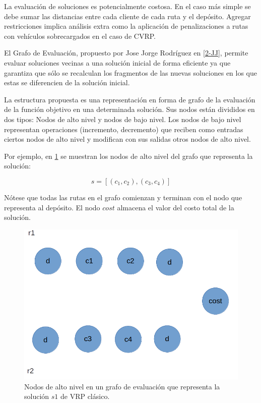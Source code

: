 La evaluación de soluciones es potencialmente costosa. En el caso más simple se debe sumar las distancias entre cada cliente de cada ruta y el depósito. Agregar restricciones implica análisis extra como la aplicación de penalizaciones a rutas con vehículos sobrecargados en el caso de CVRP.

El Grafo de Evaluación, propuesto por Jose Jorge Rodríguez en \ref{2-JJ}, permite evaluar soluciones vecinas a una solución inicial de forma eficiente ya que garantiza que sólo se recalculan los fragmentos de las nuevas soluciones en los que estas se diferencien de la solución inicial.

La estructura propuesta es una representación en forma de grafo de la evaluación de la función objetivo en una determinada solución. Sus nodos están divididos en dos tipos: Nodos de alto nivel y nodos de bajo nivel. Los nodos de bajo nivel representan operaciones (incremento, decremento) que reciben como entradas ciertos nodos de alto nivel y modifican con sus salidas otros nodos de alto nivel.

Por ejemplo, en \ref{fig:eval-graph-1} se muestran los nodos de alto nivel del grafo que representa la solución:

\begin{equation}
s = [(c_1,c_2), (c_3,c_4)]
\end{equation}

Nótese que todas las rutas en el grafo comienzan y terminan con el nodo que representa al depósito. El nodo $cost$ almacena el valor del costo total de la solución.

\begin{figure}
	\centering
	\includegraphics[width=0.9\linewidth]{Graphics/eval-graph-1}
	\caption{Nodos de alto nivel en un grafo de evaluación que representa la solución $s1$ de VRP clásico.}
	\label{fig:eval-graph-1}
\end{figure}

